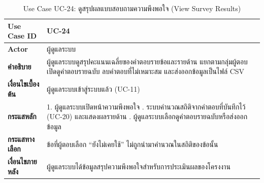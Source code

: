 \begin{table}[H]
\centering
\caption{Use Case UC-24: ดูสรุปผลแบบสอบถามความพึงพอใจ (View Survey Results)}
\label{tab:uc24}
\begin{tabular}{|p{3.2cm}|p{10cm}|}
\hline
\textbf{Use Case ID} & UC-24 \\ \hline
\textbf{Actor} & ผู้ดูแลระบบ \\ \hline
\textbf{คำอธิบาย} & ผู้ดูแลระบบดูสรุปคะแนนเฉลี่ยของคำตอบรายข้อและรายด้าน แยกตามกลุ่มผู้ตอบ เปิดดูคำตอบรายฉบับ ลบคำตอบที่ไม่เหมาะสม และส่งออกข้อมูลเป็นไฟล์ CSV \\ \hline
\textbf{เงื่อนไขเบื้องต้น} & ผู้ดูแลระบบเข้าสู่ระบบแล้ว (UC-11) \\ \hline
\textbf{กระแสหลัก} & 1. ผู้ดูแลระบบเปิดหน้าความพึงพอใจ \newline 2. ระบบคำนวณสถิติจากคำตอบที่บันทึกไว้ (UC-20) และแสดงผลรายด้าน \newline 3. ผู้ดูแลระบบเลือกดูคำตอบรายฉบับหรือส่งออกข้อมูล \\ \hline
\textbf{กระแสทางเลือก} & ข้อที่ผู้ตอบเลือก ``ยังไม่เคยใช้'' ไม่ถูกนำมาคำนวณในสถิติของข้อนั้น \\ \hline
\textbf{เงื่อนไขภายหลัง} & ผู้ดูแลระบบได้ข้อมูลสรุปความพึงพอใจสำหรับการประเมินผลของโครงงาน \\
\hline
\end{tabular}
\end{table}

